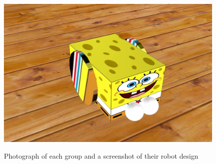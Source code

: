 \begin{figure}[p]
{  \includegraphics[width=\picsize]{summerSchoolModels/Group5robot}
}
\caption{Photograph of each group and a screenshot of their robot design}
\label{fig:groupphotos}
\end{figure}

